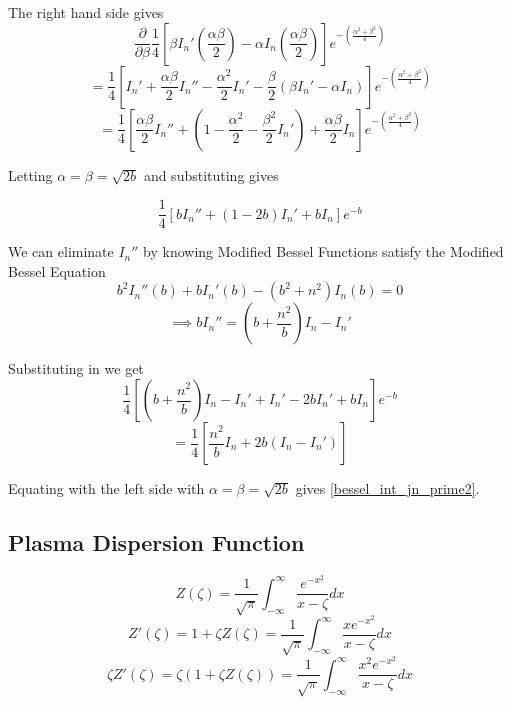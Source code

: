 The right hand side gives
\begin{equation*}
	\frac{\partial}{\partial \beta} \frac{1}{4} \left[ \beta I_n' \left( \frac{\alpha \beta}{2} \right) - \alpha I_n \left( \frac{\alpha \beta}{2} \right) \right] e^{-\left( \frac{ \alpha^2 + \beta^2 }{4} \right)}
\end{equation*}
\begin{equation*}
	= \frac{1}{4} \left[ I_n' + \frac{\alpha \beta}{2} I_n'' - \frac{\alpha^2}{2} I_n' - \frac{\beta}{2} \left( \beta I_n' - \alpha I_n \right) \right] e^{-\left( \frac{ \alpha^2 + \beta^2 }{4} \right)}
\end{equation*}
\begin{equation}
	= \frac{1}{4} \left[ \frac{\alpha \beta}{2} I_n'' + \left( 1 - \frac{\alpha^2}{2} - \frac{\beta^2}{2} I_n' \right) + \frac{\alpha \beta}{2} I_n \right] e^{-\left( \frac{ \alpha^2 + \beta^2 }{4} \right)}
\end{equation}

Letting $\alpha = \beta = \sqrt{2b}$ and substituting gives

\begin{equation}
	\frac{1}{4} \left[ b I_n'' + \left(1 - 2b \right) I_n' + b I_n \right] e^{-b}
\end{equation}

We can eliminate $I_n''$ by knowing Modified Bessel Functions satisfy the Modified Bessel Equation
\begin{equation}
	b^2 I_n'' \left( b \right) + b I_n' \left( b \right) - (b^2 + n^2) I_n \left( b \right) = 0
\end{equation}
\begin{equation}
	\implies bI_n'' = \left( b + \frac{n^2}{b} \right) I_n - I_n'
\end{equation}

Substituting in we get
\begin{equation*}
	\frac{1}{4} \left[ \left( b + \frac{n^2}{b} \right) I_n - I_n' + I_n' - 2b I_n' + b I_n \right] e^{-b}
\end{equation*}
\begin{equation}
	= \frac{1}{4} \left[ \frac{n^2}{b} I_n + 2b \left( I_n - I_n' \right) \right]
\end{equation}

Equating with the left side with $\alpha = \beta = \sqrt{2b}$ gives \eqref{bessel_int_jn_prime2}.

\subsection{Plasma Dispersion Function}
\begin{equation}
	Z(\zeta) = \frac{1}{\sqrt{\pi}} \int_{-\infty}^\infty \frac{e^{-x^2}}{x-\zeta} dx
\end{equation}
\begin{equation}
	Z'(\zeta) = 1 + \zeta Z(\zeta) = \frac{1}{\sqrt{\pi}} \int_{-\infty}^\infty \frac{xe^{-x^2}}{x-\zeta} dx
\end{equation}
\begin{equation}
	\zeta Z'(\zeta) = \zeta \left( 1 + \zeta Z(\zeta) \right) = \frac{1}{\sqrt{\pi}} \int_{-\infty}^\infty \frac{x^2 e^{-x^2}}{x-\zeta} dx
\end{equation}